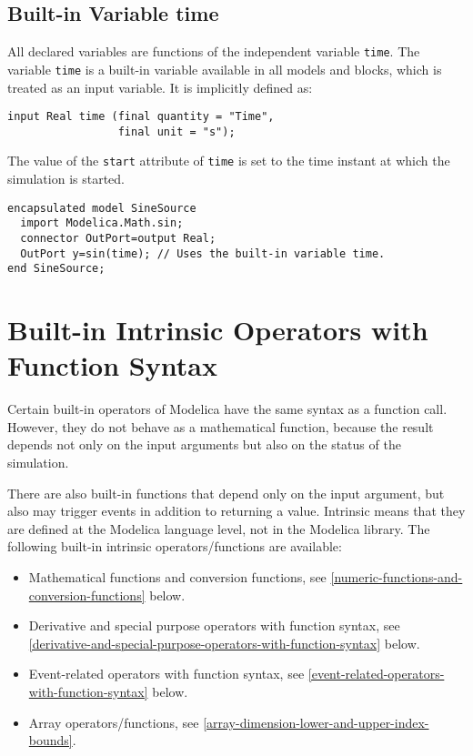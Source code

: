 \subsection{Built-in Variable time}\label{built-in-variable-time}

All declared variables are functions of the independent variable \lstinline!time!.
The variable \lstinline!time! is a built-in variable available in all models and
blocks, which is treated as an input variable. It is implicitly defined
as:
\begin{lstlisting}[language=modelica]
input Real time (final quantity = "Time",
                 final unit = "s");
\end{lstlisting}

The value of the \lstinline!start! attribute of \lstinline!time! is set to the time instant at
which the simulation is started.

\begin{example}
\begin{lstlisting}[language=modelica]
encapsulated model SineSource
  import Modelica.Math.sin;
  connector OutPort=output Real;
  OutPort y=sin(time); // Uses the built-in variable time.
end SineSource;
\end{lstlisting}
\end{example}

\section{Built-in Intrinsic Operators with Function Syntax}\label{built-in-intrinsic-operators-with-function-syntax}

Certain built-in operators of Modelica have the same syntax as a
function call. However, they do not behave as a mathematical function,
because the result depends not only on the input arguments but also on
the status of the simulation.

There are also built-in functions that depend only on the input
argument, but also may trigger events in addition to returning a value.
Intrinsic means that they are defined at the Modelica language level,
not in the Modelica library. The following built-in intrinsic
operators/functions are available:
\begin{itemize}
\item
  Mathematical functions and conversion functions, see \cref{numeric-functions-and-conversion-functions}
  below.
\item
  Derivative and special purpose operators with function syntax, see
  \cref{derivative-and-special-purpose-operators-with-function-syntax} below.
\item
  Event-related operators with function syntax, see \cref{event-related-operators-with-function-syntax} below.
\item
  Array operators/functions, see \cref{array-dimension-lower-and-upper-index-bounds}.
\end{itemize}

